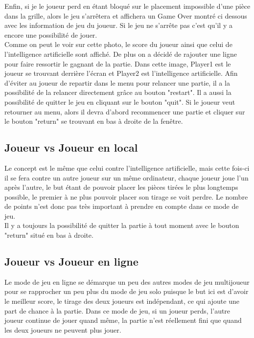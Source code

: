 \documentclass[a4paper]{report}
\begin{document}
Enfin, si je le joueur perd en étant bloqué sur le placement impossible d'une pièce dans la grille, alors le jeu s'arrêtera et affichera un Game Over montré ci dessous avec les information de jeu du joueur. Si le jeu ne s'arrête pas c'est qu'il y a encore une possibilité de jouer.  \\

Comme on peut le voir sur cette photo, le score du joueur ainsi que celui de l'intelligence artificielle sont affiché. De plus on a décidé de rajouter une ligne pour faire ressortir le gagnant de la partie. Dans cette image, Player1 est le joueur se trouvant derrière l'écran et Player2 est l'intelligence artificielle. Afin d'éviter au joueur de repartir dans le menu pour relancer une partie, il a la possibilité de la relancer directement grâce au bouton "restart". Il a aussi la possibilité de quitter le jeu en cliquant sur le bouton "quit". Si le joueur veut retourner au menu, alors il devra d'abord recommencer une partie et cliquer sur le bouton "return" se trouvant en bas à droite de la fenêtre. 

\subsection{Joueur vs Joueur en local}
Le concept est le même que celui contre l'intelligence artificielle, mais cette fois-ci il se fera contre un autre joueur sur un même ordinateur, chaque joueur joue l'un après l'autre, le but étant de pouvoir placer les pièces tirées le plus longtemps possible, le premier à ne plus pouvoir placer son tirage se voit perdre. Le nombre de points n'est donc pas très important à prendre en compte dans ce mode de jeu. \\

Il y a toujours la possibilité de quitter la partie à tout moment avec le bouton "return" situé en bas à droite.
\subsection{Joueur vs Joueur en ligne}
Le mode de jeu en ligne se démarque un peu des autres modes de jeu multijoueur pour se rapprocher un peu plus du mode de jeu solo puisque le but ici est d'avoir le meilleur score, le tirage des deux joueurs est indépendant, ce qui ajoute une part de chance à la partie. Dans ce mode de jeu, si un joueur perds, l'autre joueur continue de jouer quand même, la partie n'est réellement fini que quand les deux joueurs ne peuvent plus jouer.
\end{document}
